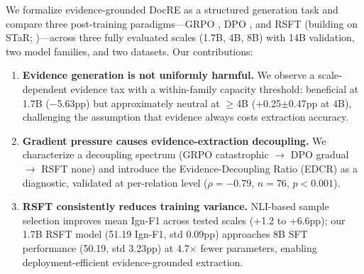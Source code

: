 We formalize evidence-grounded DocRE as a structured generation task and compare three post-training paradigms---GRPO \citep{shao2024deepseekmath}, DPO \citep{rafailov2023direct}, and RSFT (building on STaR; \citealt{zelikman2022star})---across three fully evaluated scales (1.7B, 4B, 8B) with 14B validation, two model families, and two datasets. Our contributions:
\begin{enumerate}
    \item \textbf{Evidence generation is not uniformly harmful.} We observe a scale-dependent evidence tax with a within-family capacity threshold: beneficial at 1.7B ($-$5.63pp) but approximately neutral at $\geq$4B (+0.25$\pm$0.47pp at 4B), challenging the assumption that evidence always costs extraction accuracy.

    \item \textbf{Gradient pressure causes evidence-extraction decoupling.} We characterize a decoupling spectrum (GRPO catastrophic $\rightarrow$ DPO gradual $\rightarrow$ RSFT none) and introduce the Evidence-Decoupling Ratio (EDCR) as a diagnostic, validated at per-relation level ($\rho{=}{-}0.79$, $n{=}76$, $p{<}0.001$).

    \item \textbf{RSFT consistently reduces training variance.} NLI-based sample selection improves mean Ign-F1 across tested scales (+1.2 to +6.6pp); our 1.7B RSFT model (51.19 Ign-F1, std 0.09pp) approaches 8B SFT performance (50.19, std 3.23pp) at 4.7$\times$ fewer parameters, enabling deployment-efficient evidence-grounded extraction.
\end{enumerate}
